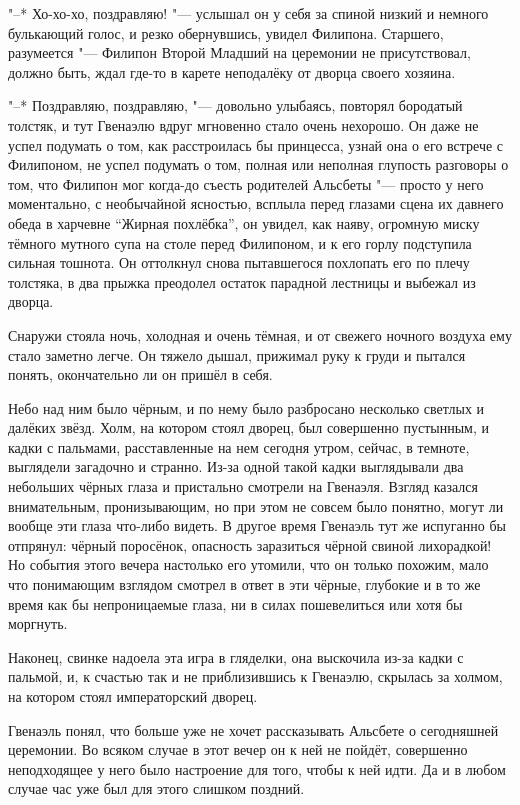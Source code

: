 "--* Хо-хо-хо, поздравляю! "--- услышал он у себя за спиной низкий и немного
булькающий голос, и резко обернувшись, увидел Филипона.
Старшего, разумеется "--- Филипон Второй Младший на церемонии не присутствовал,
должно быть, ждал где-то в карете неподалёку от дворца своего хозяина.

"--* Поздравляю, поздравляю, "--- довольно улыбаясь, повторял бородатый толстяк,
и тут Гвенаэлю вдруг мгновенно стало очень нехорошо.
Он даже не успел подумать о том, как расстроилась бы принцесса, узнай она о его
встрече с Филипоном, не успел подумать о том, полная или неполная глупость
разговоры о том, что Филипон мог когда-до съесть родителей Альсбеты "--- просто
у него моментально, с необычайной ясностью, всплыла перед глазами сцена их
давнего обеда в харчевне \enquote{Жирная похлёбка}, он увидел, как наяву,
огромную миску тёмного мутного супа на столе перед Филипоном, и к его горлу
подступила сильная тошнота.
Он оттолкнул снова пытавшегося похлопать его по плечу толстяка, в два прыжка
преодолел остаток парадной лестницы и выбежал из дворца.

Снаружи стояла ночь, холодная и очень тёмная, и от свежего ночного воздуха ему
стало заметно легче.
Он тяжело дышал, прижимал руку к груди и пытался понять, окончательно ли он
пришёл в себя.

Небо над ним было чёрным, и по нему было разбросано несколько светлых и далёких
звёзд.
Холм, на котором стоял дворец, был совершенно пустынным, и кадки с пальмами,
расставленные на нем сегодня утром, сейчас, в темноте, выглядели загадочно и
странно.
Из-за одной такой кадки выглядывали два небольших чёрных глаза и пристально
смотрели на Гвенаэля.
Взгляд казался внимательным, пронизывающим, но при этом не совсем было понятно,
могут ли вообще эти глаза что-либо видеть.
В другое время Гвенаэль тут же испуганно бы отпрянул: чёрный поросёнок,
опасность заразиться чёрной свиной лихорадкой!
Но события этого вечера настолько его утомили, что он только похожим, мало что
понимающим взглядом смотрел в ответ в эти чёрные, глубокие и в то же время как
бы непроницаемые глаза, ни в силах пошевелиться или хотя бы моргнуть.

Наконец, свинке надоела эта игра в гляделки, она выскочила из-за кадки с
пальмой, и, к счастью так и не приблизившись к Гвенаэлю, скрылась за холмом, на
котором стоял императорский дворец.

Гвенаэль понял, что больше уже не хочет рассказывать Альсбете о сегодняшней
церемонии.
Во всяком случае в этот вечер он к ней не пойдёт, совершенно неподходящее у него
было настроение для того, чтобы к ней идти.
Да и в любом случае час уже был для этого слишком поздний.
